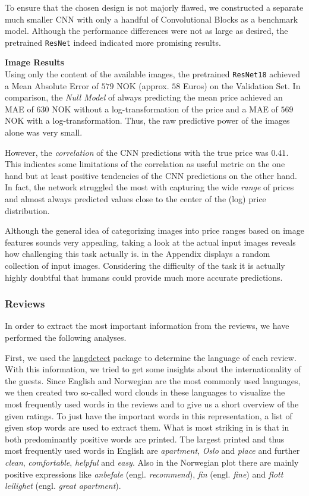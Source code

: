 To ensure that the chosen design is not majorly flawed, we constructed a separate much smaller CNN with only a handful of Convolutional Blocks as a benchmark model.
Although the performance differences were not as large as desired, the pretrained \texttt{ResNet} indeed indicated more promising results.


\textbf{Image Results} \\
Using only the content of the available images, the pretrained \texttt{ResNet18} achieved a Mean Absolute Error of $579$ NOK (approx. $58$ Euros) on the Validation Set.
In comparison, the \emph{Null Model} of always predicting the mean price achieved an MAE of $630$ NOK without a log-transformation of the price and a MAE of $569$ NOK with a log-transformation.
Thus, the raw predictive power of the images alone was very small.

However, the \emph{correlation} of the CNN predictions with the true price was $0.41$.
This indicates some limitations of the correlation as useful metric on the one hand but at least positive tendencies of the CNN predictions on the other hand.
In fact, the network struggled the most with capturing the wide \emph{range} of prices and almost always predicted values close to the center of the (log) price distribution.

Although the general idea of categorizing images into price ranges based on image features sounds very appealing, taking a look at the actual input images reveals how challenging this task actually is.
 in the Appendix displays a random collection of input images.
Considering the difficulty of the task it is actually highly doubtful that humans could provide much more accurate predictions.


\subsubsection{Reviews}

In order to extract the most important information from the reviews, we have performed the following analyses.

First, we used the \href{https://pypi.org/project/langdetect/}{langdetect} package to determine the language of each review.
With this information, we tried to get some insights about the internationality of the guests.
Since English and Norwegian are the most commonly used languages, we then created two so-called word clouds in these languages to visualize the most frequently used words in the reviews and to give us a short overview of the given ratings.
To just have the important words in this representation, a list of given stop words are used to extract them.
What is most striking in  is that in both predominantly positive words are printed.
The largest printed and thus most frequently used words in English are \textit{apartment}, \textit{Oslo} and \textit{place} and further \textit{clean}, \textit{comfortable}, \textit{helpful} and \textit{easy}.
Also in the Norwegian plot there are mainly positive expressions like \textit{anbefale} (engl. \emph{recommend}), \textit{fin} (engl. \emph{fine}) and \textit{flott leilighet} (engl. \emph{great apartment}).

